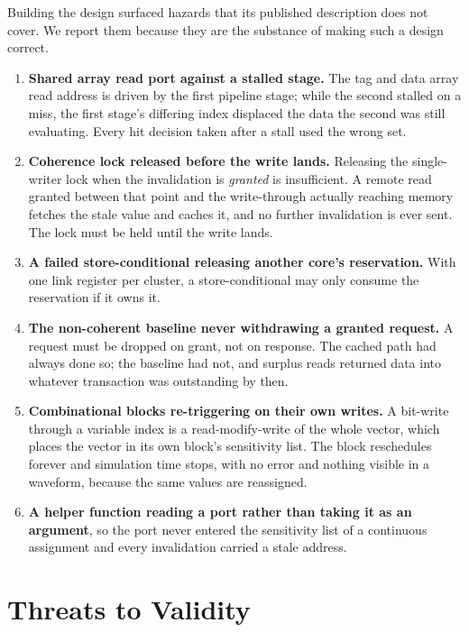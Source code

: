\documentclass[conference]{IEEEtran}
\begin{document}
Building the design surfaced hazards that its published description does not
cover. We report them because they are the substance of making such a design
correct.

\begin{enumerate}
  \item \textbf{Shared array read port against a stalled stage.} The tag and
        data array read address is driven by the first pipeline stage; while the
        second stalled on a miss, the first stage's differing index displaced the
        data the second was still evaluating. Every hit decision taken after a
        stall used the wrong set.
  \item \textbf{Coherence lock released before the write lands.} Releasing the
        single-writer lock when the invalidation is \emph{granted} is
        insufficient. A remote read granted between that point and the
        write-through actually reaching memory fetches the stale value and caches
        it, and no further invalidation is ever sent. The lock must be held until
        the write lands.
  \item \textbf{A failed store-conditional releasing another core's
        reservation.} With one link register per cluster, a store-conditional may
        only consume the reservation if it owns it.
  \item \textbf{The non-coherent baseline never withdrawing a granted request.}
        A request must be dropped on grant, not on response. The cached path had
        always done so; the baseline had not, and surplus reads returned data
        into whatever transaction was outstanding by then.
  \item \textbf{Combinational blocks re-triggering on their own writes.} A
        bit-write through a variable index is a read-modify-write of the whole
        vector, which places the vector in its own block's sensitivity list. The
        block reschedules forever and simulation time stops, with no error and
        nothing visible in a waveform, because the same values are reassigned.
  \item \textbf{A helper function reading a port rather than taking it as an
        argument}, so the port never entered the sensitivity list of a continuous
        assignment and every invalidation carried a stale address.
\end{enumerate}

\section{Threats to Validity}
\end{document}
